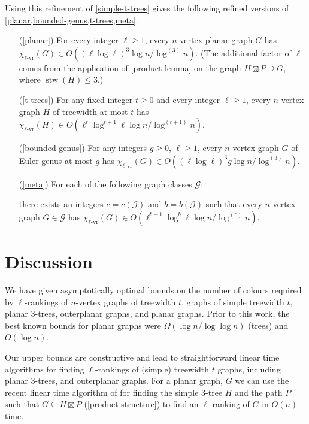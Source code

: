 \documentclass[kpfonts]{patmorin}
\DeclareMathOperator{\stw}{stw}
\newcommand{\rn}[1]{\chi_{\operatorname{#1-vr}}}
\newcommand{\lrn}{\rn{\ell}}
\theoremstyle{named}
\begin{document}
Using this refinement of \cref{simple-t-trees} gives the following refined versions of \cref{planar,bounded-genus,t-trees,meta}.
\begin{itemize}
    \item[(\ref{planar})] For every integer $\ell\ge 1$, every $n$-vertex planar graph $G$ has $\lrn(G)\in O((\ell\log \ell)^3\log n/\log^{(3)} n)$. (The additional factor of $\ell$ comes from the application of \cref{product-lemma} on the graph $H\boxtimes P\supseteq G$, where $\stw(H)\le 3$.)

    \item[(\ref{t-trees})] For any fixed integer $t\ge 0$ and every integer $\ell\ge 1$, every $n$-vertex graph $H$ of treewidth at most $t$ has $\lrn(H)\in O(\ell^t\log^{t+1}\ell \log n/\log^{(t+1)}n)$.

    \item[(\ref{bounded-genus})] For any integers $g\ge 0$, $\ell\ge 1$, every  $n$-vertex graph $G$ of Euler genus at most $g$ has $\lrn(G)\in O((\ell\log \ell)^3 g\log n/\log^{(3)} n)$.

    \item[(\ref{meta})] For each of the following graph classes $\mathcal{G}$:
    there exists an integers $c=c(\mathcal{G})$ and $b=b(\mathcal{G})$ such that every $n$-vertex graph $G\in\mathcal{G}$ has $\lrn(G)\in O(\ell^{b-1}\log^b\ell\log n/\log^{(c)} n)$.
\end{itemize}

\section{Discussion}
\label{conclusion}

We have given asymptotically optimal bounds on the number of colours required by $\ell$-rankings of $n$-vertex graphs of treewidth $t$, graphs of simple treewidth $t$, planar 3-trees, outerplanar graphs, and planar graphs.  Prior to this work, the best known bounds for planar graphs were $\Omega(\log n/\log\log n)$ (trees) and $O(\log n)$.

Our upper bounds are constructive and lead to straightforward linear time algorithms for finding $\ell$-rankings of (simple) treewidth $t$ graphs, including planar 3-trees, and outerplanar graphs.  For a planar graph, $G$ we can use the recent linear time algorithm of \citet{bose.morin.ea:optimal} for finding the simple $3$-tree $H$ and the path $P$ such that $G\subseteq H\boxtimes P$ (\cref{product-structure}) to find an $\ell$-ranking of $G$ in $O(n)$ time.
\end{document}
